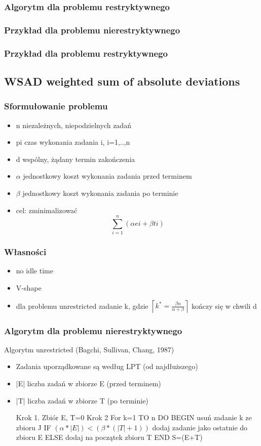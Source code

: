 \documentclass[12pt,a4paper]{article}
\begin{document}
\subsubsection{Algorytm dla problemu restryktywnego}
\subsubsection{Przykład dla problemu nierestryktywnego}
\subsubsection{Przykład dla problemu restryktywnego}
\subsection{WSAD weighted sum of absolute deviations}
\subsubsection{Sformułowanie problemu}
\begin{itemize}
\item n niezależnych, niepodzielnych zadań
\item pi czas wykonania zadania i, i=1,..,n
\item d wspólny, żądany termin zakończenia
\item $\alpha$ jednostkowy koszt wykonania zadania przed terminem
\item $\beta$ jednostkowy koszt wykonania zadania po terminie
\item cel: zminimalizować \begin{equation}
\sum\limits_{i=1}^{n}(\alpha ei+\beta ti)
\end{equation}
\end{itemize}
\subsubsection{Własności}
\begin{itemize}
\item no idle time
\item V-shape
\item dla problemu unrestricted zadanie k, gdzie $\left \lceil k^*=\frac{\beta n}{\alpha + \beta} \right \rceil$ kończy się w chwili d
\end{itemize}
\subsubsection{Algorytm dla problemu nierestryktywnego}
Algorytm unrestricted (Bagchi, Sullivan, Chang, 1987)
\begin{itemize}
	\item Zadania uporządkowane są według LPT (od najdłuższego)
	\item |E| liczba zadań w zbiorze E (przed terminem)
	\item |T| liczba zadań w zbiorze T (po terminie)
	
	Krok 1. Zbiór E, T=0
	Krok 2 For k=1 TO n DO
	BEGIN
	usuń zadanie k ze zbioru J
	IF $(\alpha * |E|)<(\beta *(|T|+1))$ dodaj zadanie jako ostatnie do zbioru E
	ELSE dodaj na początek zbioru T
	END
	S=(E+T)
\end{itemize}
\end{document}
